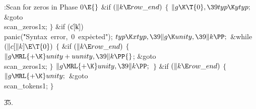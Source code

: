 \B{}:Scan for zeros in Phase 0\X${}\E{}$\6
\&{if} ${}(\|k\E\\{row\_end}){}$\5
${}\{{}$\1\6
${}\|g\K\T{0},\39\\{typ}\K\\{ytyp};{}$\6
\&{goto} \\{scan\_zeros1x};\6
\4${}\}{}$\2\6
\&{if} (\|c[\|k])\1\5
\\{panic}(\.{"Syntax\ error,\ 0\ exp}\)\.{ected"});\2\6
${}\\{typ}\K\\{xtyp},\39\|g\K\\{unity},\39\|k\PP;{}$\6
\&{while} ${}(\|c[\|k]\E\T{0}){}$\5
${}\{{}$\1\6
\&{if} ${}(\|k\E\\{row\_end}){}$\5
${}\{{}$\1\6
${}\|g\MRL{+{\K}}\\{unity}+\\{uunity},\39\|k\PP{}$;\6
\&{goto} \\{scan\_zeros1x};\6
\4${}\}{}$\2\6
${}\|g\MRL{+{\K}}\\{unity},\39\|k\PP;{}$\6
\4${}\}{}$\2\6
\&{if} ${}(\|k\E\\{row\_end}){}$\5
${}\{{}$\1\6
${}\|g\MRL{+{\K}}\\{unity};{}$\6
\&{goto} \\{scan\_tokens1};\6
\4${}\}{}$\2\par
\U35.\fi

